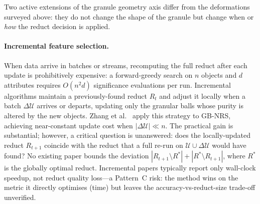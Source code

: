 Two active extensions of the granule geometry axis differ from the deformations
surveyed above: they do not change the shape of the granule but change
when or \emph{how} the reduct decision is applied.

\paragraph{Incremental feature selection.}
When data arrive in batches or streams, recomputing the full reduct after each
update is prohibitively expensive: a forward-greedy search on $n$ objects and
$d$ attributes requires $O(n^2 d)$ significance evaluations per run.
Incremental algorithms maintain a previously-found reduct $R_t$ and adjust it
locally when a batch $\Delta\mathcal{U}$ arrives or departs, updating only the
granular balls whose purity is altered by the new objects.
Zhang et al.~\cite{Zhang2023TKDEincremental} apply this strategy to GB-NRS,
achieving near-constant update cost when $|\Delta\mathcal{U}| \ll n$.
The practical gain is substantial; however, a critical question is unanswered:
does the locally-updated reduct $R_{t+1}$ coincide with the reduct that a full
re-run on $\mathcal{U} \cup \Delta\mathcal{U}$ would have found?
No existing paper bounds the deviation $|R_{t+1} \setminus R^*| + |R^* \setminus R_{t+1}|$,
where $R^*$ is the globally optimal reduct.
Incremental papers typically report only wall-clock speedup, not reduct quality
loss---a Pattern~C risk: the method wins on the metric it directly optimises
(time) but leaves the accuracy-vs-reduct-size trade-off unverified.

